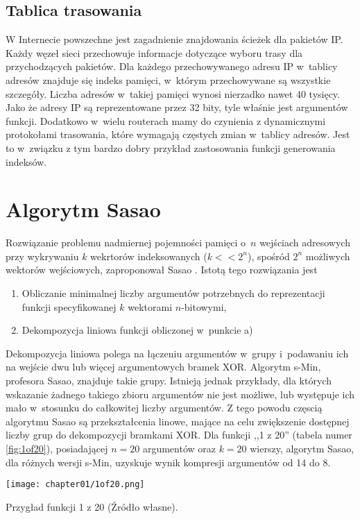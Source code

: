 \subsection{Tablica trasowania}
W Internecie powszechne jest zagadnienie znajdowania ścieżek dla pakietów IP.
Każdy węzeł sieci przechowuje informacje dotyczące wyboru trasy dla przychodzących pakietów.
Dla każdego przechowywanego adresu IP w~tablicy adresów znajduje się indeks pamięci, w~którym przechowywane są wszystkie szczegóły.
Liczba adresów w~takiej pamięci wynosi nierzadko nawet 40 tysięcy.
Jako że adresy IP są reprezentowane przez 32 bity, tyle właśnie jest argumentów funkcji.
Dodatkowo w~wielu routerach mamy do czynienia z dynamicznymi protokołami trasowania, które wymagają częstych zmian w~tablicy adresów.
Jest to w~związku z tym bardzo dobry przykład zastosowania funkcji generowania indeksów.


\section{Algorytm Sasao}
Rozwiązanie problemu nadmiernej pojemności pamięci o~$n$ wejściach adresowych przy wykrywaniu $k$ wekrtorów indeksowanych ($k<<2^n$),
spośród $2^n$ możliwych wektorów wejściowych,
zaproponował Sasao \cite{sasao-workshop, sasao-recent, sasao-s-min, sasao-synthesis}.
Istotą tego rozwiązania jest
\begin{enumerate}[label=\alph*)]
\item Obliczanie minimalnej liczby argumentów potrzebnych do reprezentacji funkcji specyfikowanej $k$ wektorami $n$-bitowymi,
\item Dekompozycja liniowa funkcji obliczonej w~punkcie a)
\end{enumerate}

Dekompozycja liniowa polega na łączeniu argumentów w~grupy i~podawaniu ich na wejście dwu lub więcej argumentowych bramek XOR.
Algorytm s-Min, profesora Sasao, znajduje takie grupy.
Istnieją jednak przykłady,
dla których wskazanie żadnego takiego zbioru argumentów nie jest możliwe,
lub występuje ich mało w~stosunku do całkowitej liczby argumentów.
Z tego powodu częscią algorytmu Sasao są przekształcenia linowe,
mające na celu zwiększenie dostępnej liczby grup do dekompozycji bramkami XOR.
Dla funkcji ,,1 z 20'' (tabela numer \ref{fig:1of20}),
posiadającej $n=20$ argumentów oraz $k=20$ wierszy,
algorytm Sasao,
dla różnych wersji s-Min,
uzyskuje wynik kompresji argumentów od 14 do 8.

\begin{table}
\centering
\texttt{[image: chapter01/1of20.png]}
\caption{Przygład funkcji 1 z 20 (Źródło własne).}
\label{fig:1of20}
\end{table}

